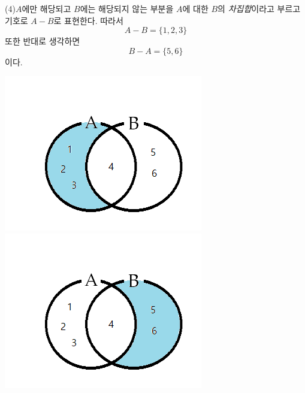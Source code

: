 \documentclass{oblivoir}
\begin{document}
\noindent
\begin{minipage}{0.65\textwidth}
(4)\:\(A\)에만 해당되고 \(B\)에는 해당되지 않는 부분을
\(A\)에 대한 \(B\)의 \emph{차집합}이라고 부르고 기호로 \(A-B\)로 표현한다.
따라서
\[A-B=\{1,2,3\}\]
또한 반대로 생각하면
\[B-A=\{5,6\}\]
이다.
\end{minipage}
\begin{minipage}{0.3\textwidth}
\begin{center}
\includegraphics[width=\textwidth]{operations_1-4}\\
\includegraphics[width=\textwidth]{operations_1-5}\\
\end{center}
\end{minipage}
\end{document}
